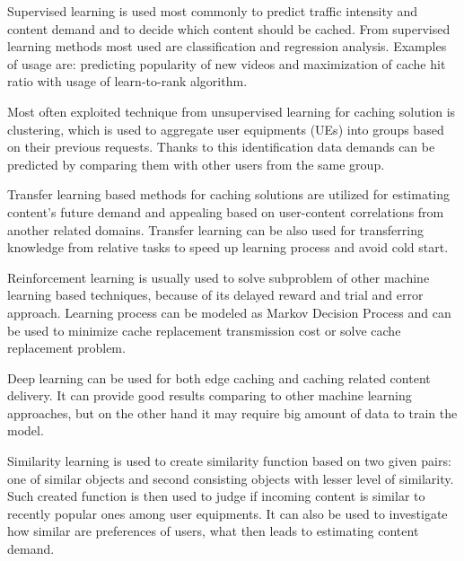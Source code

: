\documentclass[conference]{IEEEtran}
\begin{document}
Supervised learning is used most commonly to predict traffic intensity and content demand and to decide which content should be cached. From supervised learning methods most used are classification and regression analysis\cite{cache1}. Examples of usage are: predicting popularity of new videos and maximization of cache hit ratio with usage of learn-to-rank algorithm\cite{cache3}.\par
Most often exploited technique from unsupervised learning for caching solution is clustering, which is used to aggregate user equipments (UEs) into groups based on their previous requests. Thanks to this identification data demands can be predicted by comparing them with other users from the same group\cite{cache1}.\par
Transfer learning based methods for caching solutions are utilized for estimating content's future demand and appealing based on user-content correlations from another related domains\cite{cache1}. Transfer learning can be also used for transferring knowledge from relative tasks to speed up learning process and avoid cold start\cite{cache3}.\par
Reinforcement learning is usually used to solve subproblem of other machine learning based techniques, because of its delayed reward and trial and error approach. Learning process can be modeled as Markov Decision Process and can be used to minimize cache replacement transmission cost or solve cache replacement problem\cite{cache3}.\par
Deep learning can be used for both edge caching and caching related content delivery. It can provide good results comparing to other machine learning approaches, but on the other hand it may require big amount of data to train the model\cite{cache1}.\par
Similarity learning is used to create similarity function based on two given pairs: one of similar objects and second consisting objects with lesser level of similarity. Such created function is then used to judge if incoming content is similar to recently popular ones among user equipments\cite{cache1}. It can also be used to investigate how similar are preferences of users, what then leads to estimating content demand.\par\newpage
\end{document}
